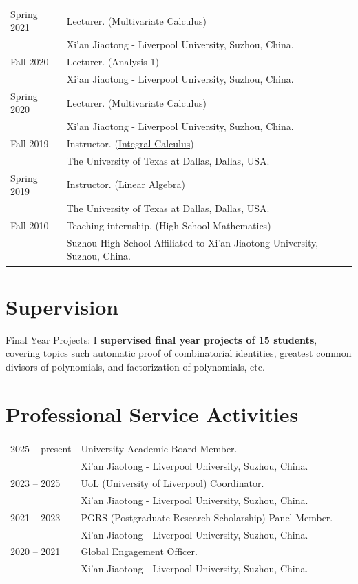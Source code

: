 \documentclass[a4paper,12pt]{article}
\begin{document}
\begin{tabular}{@{}p{1.4in}p{4.5in}}
Spring 2021 & Lecturer. (Multivariate Calculus) \\
             & Xi'an Jiaotong - Liverpool University, Suzhou, China.   \\
Fall 2020 & Lecturer. (Analysis 1) \\
               & Xi'an Jiaotong - Liverpool University, Suzhou, China.   \\
Spring 2020 & Lecturer. (Multivariate Calculus) \\
             & Xi'an Jiaotong - Liverpool University, Suzhou, China.   \\
Fall 2019 & Instructor. (\href{https://yzhang1616.github.io/calculus19fall/calculus.html}{Integral Calculus}) \\
             & The University of Texas at Dallas, Dallas, USA.   \\
Spring 2019           & Instructor. (\href{https://yzhang1616.github.io/algebra19spring/algebra.html}{Linear Algebra}) \\
                      & The University of Texas at Dallas, Dallas, USA. \\
Fall 2010             & Teaching internship. (High School Mathematics) \\
                      & Suzhou High School Affiliated to Xi'an Jiaotong University, Suzhou, China.                        
\end{tabular}

\section*{\Large{Supervision}}

Final Year Projects: I \textbf{supervised final year projects of 15 students}, covering topics such automatic proof of combinatorial identities, greatest common divisors of polynomials, and factorization of polynomials, etc.

\section*{\Large{Professional Service Activities}}
\begin{tabular}{@{}p{1.4in}p{4.5in}} 
2025 -- present & University Academic Board Member. \\
                           & Xi'an Jiaotong - Liverpool University, Suzhou, China.  \\
2023 -- 2025 & UoL (University of Liverpool) Coordinator. \\
                           & Xi'an Jiaotong - Liverpool University, Suzhou, China.  \\
2021 -- 2023 & PGRS (Postgraduate Research Scholarship) Panel Member. \\
                           & Xi'an Jiaotong - Liverpool University, Suzhou, China.  \\
2020 -- 2021 & Global Engagement Officer. \\
             & Xi'an Jiaotong - Liverpool University, Suzhou, China.                  
\end{tabular}
\end{document}

